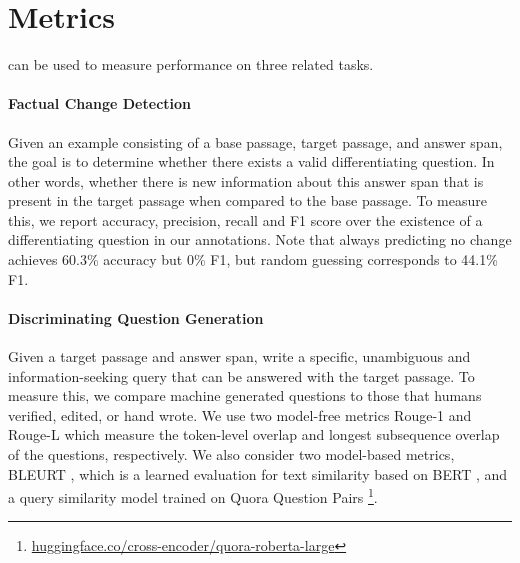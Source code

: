 \section{Metrics}\label{sec:metrics}
\dataset{} can be used to measure performance on three related tasks. %

\paragraph{Factual Change Detection} \label{Metric:Diff Detection}  Given an example consisting of a base passage, target passage, and answer span, the goal is to determine whether there exists a valid differentiating question. In other words, whether there is new information about this answer span that is present in the target passage when compared to the base passage. To measure this, we report accuracy, precision, recall and F1 score over the existence of a differentiating question in our annotations. Note that always predicting no change achieves 60.3\% accuracy but 0\% F1, but random guessing corresponds to 44.1\% F1. 

\paragraph{Discriminating Question Generation} Given a target passage and answer span, write a specific, unambiguous and information-seeking query that can be answered  with the target passage. To measure this, we compare machine generated questions to those that humans verified, edited, or hand wrote. We use two model-free metrics Rouge-1 and Rouge-L \citep{lin2004rouge} which measure the token-level overlap and longest subsequence overlap of the questions, respectively. We also consider two model-based metrics, BLEURT \citep{sellam-etal-2020-learning}, which is a learned evaluation for text similarity based on BERT \citep{devlin-etal-2019-bert}, and a query similarity model \citep{reimers-2019-sentence-bert} trained on Quora Question Pairs \footnote{\href{https://huggingface.co/cross-encoder/quora-roberta-large}{huggingface.co/cross-encoder/quora-roberta-large}}.


